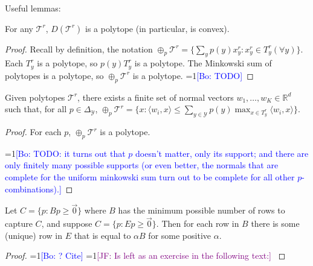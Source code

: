 \documentclass[anon]{colt2020} %
\newcommand{\Comments}{1}
\newcommand{\mynote}[2]{\ifnum\Comments=1\textcolor{#1}{#2}\fi}
\newcommand{\jessie}[1]{\mynote{purple}{[JF: #1]}}
\newcommand{\bo}[1]{\mynote{blue}{[Bo: #1]}}
\newcommand{\reals}{\mathbb{R}}
\newcommand{\simplex}{\Delta_\Y}
\newcommand{\T}{\mathcal{T}}
\newcommand{\Y}{\mathcal{Y}}
\newcommand{\inprod}[2]{\langle #1, #2 \rangle}%
\begin{document}
Useful lemmas:
\begin{lemma} \label{lemma:D-polytope}
  For any $\T^r$, $D(\T^r)$ is a polytope (in particular, is convex).
\end{lemma}
\begin{proof}
   Recall by definition, the notation $\oplus_p \T^r = \{\sum_y p(y) x^r_y : x^r_y \in T^r_y (\forall y)\}$.
   Each $T^r_y$ is a polytope, so $p(y) T^r_y$ is a polytope.
   The Minkowski sum of polytopes is a polytope, so $\oplus_p \T^r$ is a polytope.
  \bo{TODO}
\end{proof}
\begin{lemma}  \label{lemma:minkowski-support}
  Given polytopes $\T^r$, there exists a finite set of normal vectors $w_1,\ldots,w_K \in \reals^d$ such that, for all $p \in \simplex$, $\oplus_p \T^r = \{x : \inprod{w_i}{x} \leq \sum_{y \in \Y} p(y) \max_{x \in T^r_y} \inprod{w_i}{x} \}$.
\end{lemma}
\begin{proof}
   For each $p$, $\oplus_p \T^r$ is a polytope.

  \bo{TODO: it turns out that $p$ doesn't matter, only its support; and there are only finitely many possible supports (or even better, the normals that are complete for the uniform minkowski sum turn out to be complete for all other $p$-combinations).}
\end{proof}
\begin{lemma} \label{lemma:E-to-B}
  Let $C = \{p : Bp \geq \vec 0 \}$ where $B$ has the minimum possible number of rows to capture $C$, and suppose $C = \{p : Ep \geq \vec 0 \}$.
  Then for each row in $B$ there is some (unique) row in $E$ that is equal to $\alpha B$ for some positive $\alpha$.
\end{lemma}
\begin{proof}
  \bo{? Cite} \jessie{Is left as an exercise in the following text:} \cite[Exercise 2.15]{ziegler2012lectures}
\end{proof}
\end{document}
